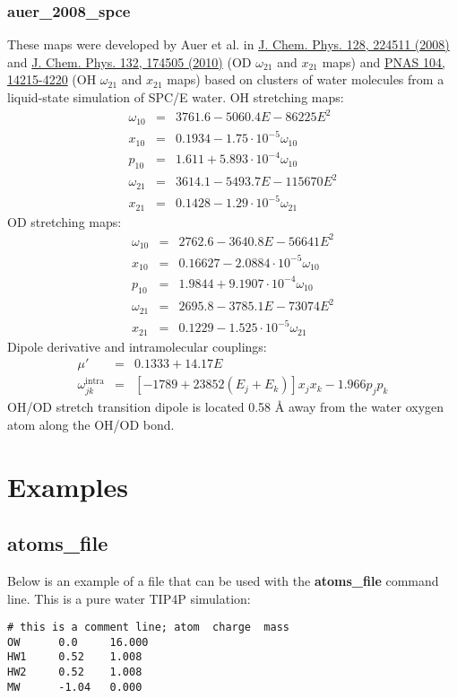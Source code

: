 \documentclass{article}
\begin{document}
\subsubsection{auer\_2008\_spce}
These maps were developed by  Auer et al. in \href{https://doi.org/10.1063/1.2925258}{J. Chem. Phys. 128, 224511 (2008)} 
and \href{http://dx.doi.org/10.1063/1.3409561}{J. Chem. Phys. 132, 174505 (2010)} (OD $\omega_{21}$ and $x_{21}$ maps)
and \href{http://www.pnas.org/cgi/doi/10.1073/pnas.0701482104}{PNAS 104, 14215-4220} (OH $\omega_{21}$ and $x_{21}$ maps)
based on clusters
of water molecules from a liquid-state simulation of SPC/E water. OH stretching maps:
\begin{eqnarray}
\omega_{10} &=& 3761.6 - 5060.4 E - 86225 E^2\nonumber\\
x_{10} &=& 0.1934 - 1.75\cdot 10^{-5} \omega_{10} \nonumber \\
p_{10} &=& 1.611 + 5.893\cdot 10^{-4} \omega_{10} \nonumber \\
\omega_{21} &=& 3614.1 - 5493.7E-115670 E^2 \nonumber \\
x_{21} &=& 0.1428 - 1.29\cdot 10^{-5} \omega_{21} \nonumber 
\end{eqnarray}
OD stretching maps:
\begin{eqnarray}
\omega_{10} &=& 2762.6 - 3640.8E-56641 E^2 \nonumber\\
x_{10} &=& 0.16627 - 2.0884\cdot 10^{-5} \omega_{10} \nonumber \\
p_{10} &=& 1.9844 + 9.1907\cdot 10^{-4} \omega_{10} \nonumber \\
\omega_{21} &=& 2695.8 - 3785.1E-73074 E^2 \nonumber \\
x_{21} &=& 0.1229 - 1.525\cdot 10^{-5} \omega_{21} \nonumber 
\end{eqnarray}
Dipole derivative and intramolecular couplings:
\begin{eqnarray}
\mu' &=& 0.1333 + 14.17E \nonumber \\
\omega_{jk}^\text{intra}&=& [-1789 + 23852(E_j + E_k)]x_jx_k - 1.966 p_j p_k \nonumber
\end{eqnarray}
OH/OD stretch transition dipole is located 0.58 \AA{} away from the water oxygen atom along the OH/OD bond.



\section{Examples}


 



\begin{appendix}
\section{\label{app:atomsf}atoms\_file}
Below is an example of a file that can be used with the \textbf{atoms\_file} command line. This is a pure water TIP4P simulation:
\begin{verbatim}
# this is a comment line; atom  charge  mass
OW      0.0     16.000
HW1     0.52    1.008
HW2     0.52    1.008
MW      -1.04   0.000
\end{verbatim}

\end{appendix}
\end{document}
